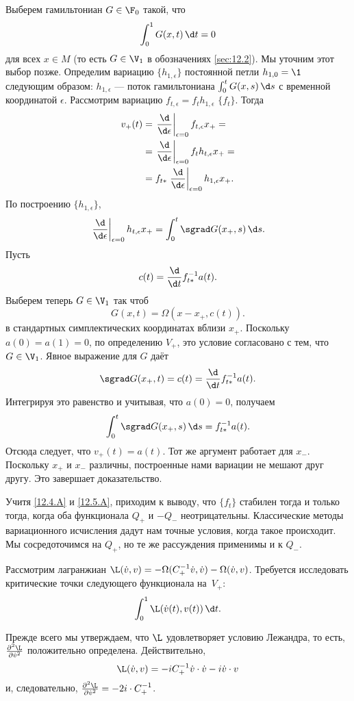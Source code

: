 Выберем гамильтониан $G\in\F_0$ такой, что
\[\int_0^1G(x, t)\,\d t = 0\]
для всех $x\in M$ (то есть $G\in\V_1$ в обозначениях \ref{sec:12.2}).
Мы уточним этот выбор позже.
Определим вариацию $\{h_{1,\epsilon}\}$ постоянной петли $h_{1,0} = \1$ следующим образом: $h_{1,\epsilon}$ --- поток гамильтониана $\int_0^tG(x,s)\,\d s$ с временной координатой $\epsilon$.
Рассмотрим вариацию $f_{t,\epsilon} = f_th_{1,\epsilon}$  $\{f_t\}$.
Тогда
\begin{align*}
v_+(t) &= \left.\frac{\d}{\d \epsilon}\right|_{\epsilon=0} f_{t,\epsilon} x_+ =
\\
&=\left.\frac{\d}{\d \epsilon}\right|_{\epsilon=0}f_th_{t,\epsilon} x_+=
\\
&=
f_{t*} \left.\frac{\d}{\d \epsilon}\right|_{\epsilon=0} h_{1,\epsilon} x_+.
\end{align*}
По построению $\{h_{1,\epsilon}\}$,
\[\left.\frac{\d}{\d \epsilon}\right|_{\epsilon=0}h_{t,\epsilon}x_+
=
\int_0^t\sgrad G(x_+,s)\,\d s.\]
Пусть 
\[c(t) = \frac{\d}{\d t}f^{-1}_{t*} a(t).\]
Выберем теперь $G \in \V_1$ так чтоб 
\[G(x, t) = \Omega(x - x_+, c(t)).\]
в стандартных симплектических координатах вблизи $x_+$.
Поскольку $a(0) = a(1) = 0$, по определению $V_+$, это условие согласовано с тем, что $G\in\V_1$.
Явное выражение для $G$ даёт 
\[\sgrad G(x_+, t) = c(t) = \frac{\d}{\d t}f^{-1}_{t*} a(t).\]
Интегрируя это равенство и учитывая, что $a(0) = 0$, получаем
\[\int_0^t\sgrad G(x_+, s)\,\d s = f_{t*}^{-1}a(t).\]
Отсюда следует, что $v_+(t) = a(t)$.
Тот же аргумент работает для $x_-$.
Поскольку $x_+$ и $x_-$ различны, построенные нами вариации не мешают друг другу.
Это завершает доказательство.
\qeds

Учитя \ref{12.4.A} и \ref{12.5.A}, приходим к выводу, что  $\{f_t\}$ стабилен тогда и только тогда, когда оба функционала $Q_+$ и $-Q_-$ неотрицательны.
Классические методы вариационного исчисления дадут нам точные условия, когда такое происходит.
Мы сосредоточимся на $Q_+$, но те же рассуждения применимы и к $Q_-$.

Рассмотрим лагранжиан $\L(\dot v, v) = -\Omega(C_+^{-1}\dot v, \dot v) - \Omega(\dot v, v)$.
Требуется исследовать критические точки следующего функционала на~$V_+$:
\[\int_0^1 \L(\dot v(t), v(t))\,\d t.\]

Прежде всего мы утверждаем, что $\L$ удовлетворяет условию Лежандра, то есть, $\tfrac{\partial^2\L}{\partial\dot v^2}$ положительно определена.
Действительно, 
\[\L( \dot v, v) = -iC_+^{-1} \dot v\cdot\dot v - i\dot v\cdot v\]
и, следовательно, $\tfrac{\partial^2\L}{\partial\dot v^2}= - 2i\cdot C_+^{-1}$.

